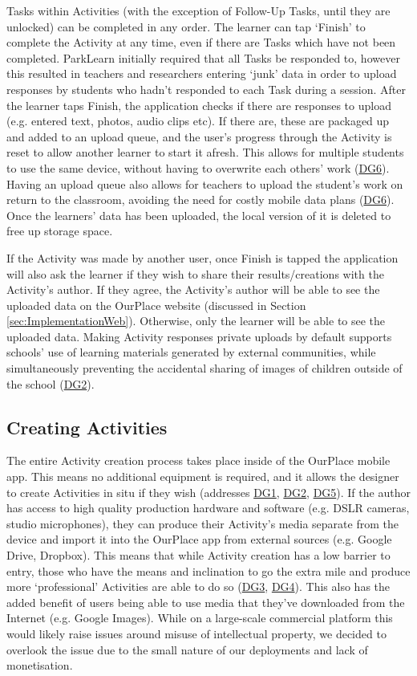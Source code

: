 Tasks within Activities (with the exception of Follow-Up Tasks, until they are unlocked) can be completed in any order. The learner can tap `Finish' to complete the Activity at any time, even if there are Tasks which have not been completed. ParkLearn initially required that all Tasks be responded to, however this resulted in teachers and researchers entering `junk' data in order to upload responses by students who hadn't responded to each Task during a session. After the learner taps Finish, the application checks if there are responses to upload (e.g. entered text, photos, audio clips etc). If there are, these are packaged up and added to an upload queue, and the user's progress through the Activity is reset to allow another learner to start it afresh. This allows for multiple students to use the same device, without having to overwrite each others' work (\hyperref[DG6]{DG6}). Having an upload queue also allows for teachers to upload the student's work on return to the classroom, avoiding the need for costly mobile data plans (\hyperref[DG6]{DG6}). Once the learners' data has been uploaded, the local version of it is deleted to free up storage space.

If the Activity was made by another user, once Finish is tapped the application will also ask the learner if they wish to share their results/creations with the Activity's author. If they agree, the Activity's author will be able to see the uploaded data on the OurPlace website (discussed in Section \ref{sec:ImplementationWeb}). Otherwise, only the learner will be able to see the uploaded data. Making Activity responses private uploads by default supports schools' use of learning materials generated by external communities, while simultaneously preventing the accidental sharing of images of children outside of the school (\hyperref[DG2]{DG2}). 

\subsection{Creating Activities}

The entire Activity creation process takes place inside of the OurPlace mobile app. This means no additional equipment is required, and it allows the designer to create Activities in situ if they wish (addresses \hyperref[DG1]{DG1}, \hyperref[DG2]{DG2}, \hyperref[DG5]{DG5}). If the author has access to high quality production hardware and software (e.g. DSLR cameras, studio microphones), they can produce their Activity's media separate from the device and import it into the OurPlace app from external sources (e.g. Google Drive, Dropbox). This means that while Activity creation has a low barrier to entry, those who have the means and inclination to go the extra mile and produce more `professional' Activities are able to do so (\hyperref[DG3]{DG3}, \hyperref[DG4]{DG4}). This also has the added benefit of users being able to use media that they've downloaded from the Internet (e.g. Google Images). While on a large-scale commercial platform this would likely raise issues around misuse of intellectual property, we decided to overlook the issue due to the small nature of our deployments and lack of monetisation.

